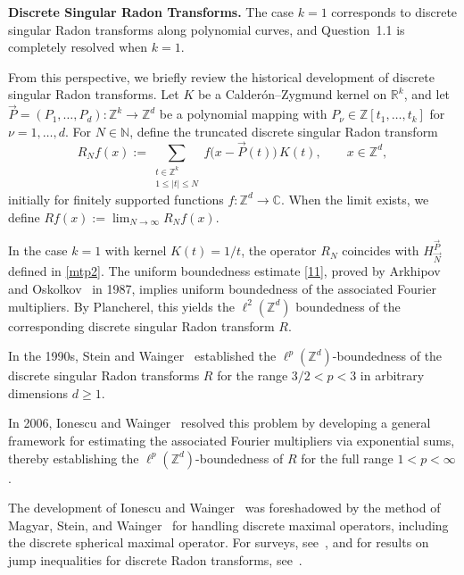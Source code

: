 \documentclass[10pt,a4paper]{amsart}
\numberwithin{equation}{section}
\begin{document}
\noindent \textbf{Discrete Singular Radon Transforms.}
The case $k=1$ corresponds to discrete singular Radon transforms
along polynomial curves, and Question~1.1 is completely resolved
when $k=1$. 

 From this perspective, we briefly review the historical development of discrete singular Radon transforms.
Let $K$ be a Calder\'on--Zygmund kernel on $\mathbb{R}^k$, and let 
$\vec{P}=(P_1,\dots,P_d):\mathbb{Z}^k\to \mathbb{Z}^d$ be a polynomial mapping with 
$P_\nu \in \mathbb{Z}[t_1,\dots,t_k]$ for $\nu=1,\dots,d$. 
For $N\in\mathbb{N}$, define the truncated discrete singular Radon transform
\[
R_N f(x)
:=
\sum_{\substack{t\in \mathbb{Z}^k\\ 1\le |t|\le N}}
f\bigl(x-\vec P(t)\bigr)\,K(t),
\qquad x\in \mathbb{Z}^d,
\]
initially for finitely supported functions $f:\mathbb{Z}^d\to\mathbb{C}$. 
When the limit exists, we define $Rf(x):=\lim_{N\to\infty}R_N f(x)$.


In the case \(k=1\) with kernel \(K(t)=1/t\), the operator \(R_N\) coincides with \(H_{\vec{N}}^{\vec{P}}\) defined in \eqref{mtp2}.
 The uniform boundedness estimate \eqref{11}, proved by Arkhipov and
 Oskolkov~\cite{AO} in 1987, implies uniform boundedness of the
 associated Fourier multipliers. By Plancherel, this yields the $\ell^2(\mathbb{Z}^d)$ boundedness of the corresponding discrete singular Radon transform $R$.

In the 1990s, Stein and Wainger~\cite{SW2,SW3} established the $\ell^p(\mathbb{Z}^d)$-boundedness of the discrete singular Radon transforms $R$ for the range $3/2< p < 3$ in arbitrary dimensions $d\ge 1$.    


In 2006, Ionescu and Wainger~\cite{IW} resolved this problem by developing a general framework for estimating the associated Fourier multipliers via exponential sums, thereby establishing the $\ell^p(\mathbb{Z}^d)$-boundedness of $R$ for the full range $1<p<\infty$.

The development of Ionescu and Wainger~\cite{IW}  was foreshadowed by the method of Magyar, Stein, and Wainger~\cite{MSW} for handling discrete maximal operators, including the discrete spherical maximal operator. For surveys, see~\cite{IMW}, and for results on jump inequalities for discrete Radon transforms, see~\cite{MSZ}.  \\
\end{document}
